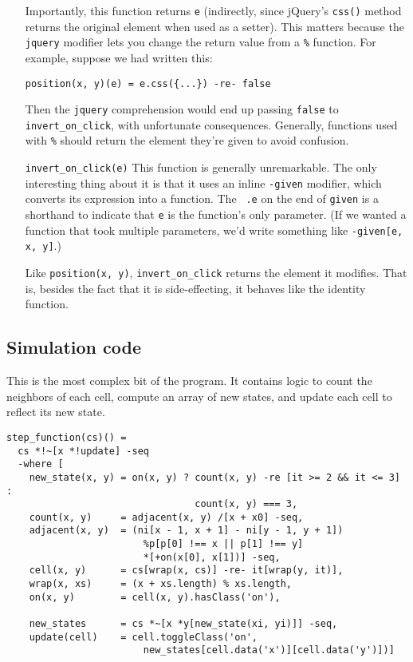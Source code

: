 \documentclass{report}
\begin{document}
\begin{enumerate}
  Importantly, this function returns {\tt e} (indirectly, since jQuery's {\tt css()} method returns the original element when used as a setter). This matters because the {\tt jquery}
  modifier lets you change the return value from a \verb|%| function. For example, suppose we had written this:

\begin{verbatim}
position(x, y)(e) = e.css({...}) -re- false
\end{verbatim}

  Then the {\tt jquery} comprehension would end up passing {\tt false} to \verb|invert_on_click|, with unfortunate consequences. Generally, functions used with \verb|%| should return
  the element they're given to avoid confusion.

\item[{\tt invert\_on\_click(e)}]
  This function is generally unremarkable. The only interesting thing about it is that it uses an inline {\tt -given} modifier, which converts its expression into a function. The {\tt
  .e} on the end of {\tt given} is a shorthand to indicate that {\tt e} is the function's only parameter. (If we wanted a function that took multiple parameters, we'd write something
  like {\tt -given[e, x, y]}.)

  Like {\tt position(x, y)}, \verb|invert_on_click| returns the element it modifies. That is, besides the fact that it is side-effecting, it behaves like the identity function.
\end{enumerate}

\subsection{Simulation code}
      This is the most complex bit of the program. It contains logic to count the neighbors of each cell, compute an array of new states, and update each cell to reflect its new state.

\begin{verbatim}
step_function(cs)() =
  cs *!~[x *!update] -seq
  -where [
    new_state(x, y) = on(x, y) ? count(x, y) -re [it >= 2 && it <= 3] :
                                 count(x, y) === 3,
    count(x, y)     = adjacent(x, y) /[x + x0] -seq,
    adjacent(x, y)  = (ni[x - 1, x + 1] - ni[y - 1, y + 1])
                        %p[p[0] !== x || p[1] !== y]
                        *[+on(x[0], x[1])] -seq,
    cell(x, y)      = cs[wrap(x, cs)] -re- it[wrap(y, it)],
    wrap(x, xs)     = (x + xs.length) % xs.length,
    on(x, y)        = cell(x, y).hasClass('on'),

    new_states      = cs *~[x *y[new_state(xi, yi)]] -seq,
    update(cell)    = cell.toggleClass('on',
                        new_states[cell.data('x')][cell.data('y')])]
\end{verbatim}
\end{document}
